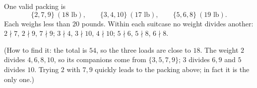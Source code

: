 One valid packing is
\[\{2,7,9\}\ (18\text{ lb}),\qquad\{3,4,10\}\ (17\text{ lb}),\qquad\{5,6,8\}\ (19\text{ lb}).\]
Each weighs less than $20$ pounds. Within each suitcase no weight divides another: $2\nmid7$, $2\nmid9$, $7\nmid9$; $3\nmid4$, $3\nmid10$, $4\nmid10$; $5\nmid6$, $5\nmid8$, $6\nmid8$.

(How to find it: the total is $54$, so the three loads are close to $18$. The weight $2$ divides $4,6,8,10$, so its companions come from $\{3,5,7,9\}$; $3$ divides $6,9$ and $5$ divides $10$. Trying $2$ with $7,9$ quickly leads to the packing above; in fact it is the only one.)

